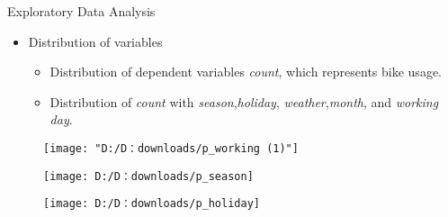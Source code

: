 \documentclass[
 size=14pt,
 paper=smartboard,  %
 mode=present, 		%
 display=slides, 	%
 style=tuliplab,  	%
 pauseslide,
 fleqn,leqno]{powerdot}
\begin{document}

\begin{slide}[toc=,bm=]{Exploratory Data Analysis}
	\begin{itemize}
		\item
		Distribution of variables
		
		\begin{itemize}
			\item
			Distribution of dependent variables \emph{count}, which represents bike usage.
			
			\item
			Distribution of \emph{count} with \emph{season},\emph{holiday}, \emph{weather},\emph{month}, and \emph{working day}.		
			
			
		\end{itemize}
	\end{itemize}
	
	\begin{center}
		\begin{minipage}{0.3\linewidth}
			\centering
			
\begin{figure}
	\caption[Description of Count and Workingday]{}
	\label{fig:pworking-1}
	\texttt{[image: "D:/D：downloads/p\_working (1)"]}
\end{figure}
			
		\end{minipage}
		\hfill
		\begin{minipage}{0.3\linewidth}
			\centering
			
\begin{figure}
	\caption[Description of Count and Season]{}
	\label{fig:pseason}
	\texttt{[image: D:/D：downloads/p\_season]}
\end{figure}
				
			
		\end{minipage}
		\hfill
		\begin{minipage}{0.3\linewidth}
			\centering
			
\begin{figure}
	\caption[Description of Count and Holiday]{}
	\label{fig:pholiday}
	\texttt{[image: D:/D：downloads/p\_holiday]}
\end{figure}
				
			
		\end{minipage}
	\end{center}
	
	
\end{slide}
\end{document}
